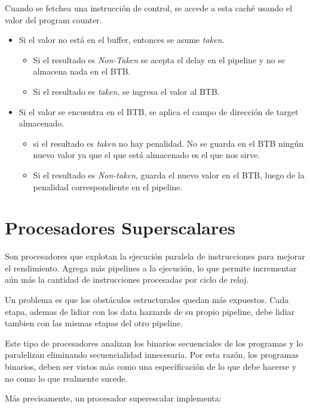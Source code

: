 \begin{itemize}
	Cuando se fetchea una instrucción de control, se accede a esta caché usando el valor del program counter.
	\begin{itemize}
		\item Si el valor no está en el buffer, entonces se asume \textit{taken}.
		\begin{itemize}
			\item Si el resultado es \textit{Non-Taken} se acepta el delay en el pipeline y no se almacena nada en el BTB.
			\item Si el resultado es \textit{taken}, se ingresa el valor al BTB.
		\end{itemize}
		\item Si el valor se encuentra en el BTB, se aplica el campo de dirección de target almacenado.
		\begin{itemize}
			\item si el resultado es \textit{taken} no hay penalidad. No se guarda en el BTB ningún nuevo valor ya que el que está almacenado es el que nos sirve.
			\item Si el resultado es \textit{Non-taken}, guarda el nuevo valor en el BTB, luego de la penalidad correspondiente en el pipeline. 
		\end{itemize}
	\end{itemize}
\end{itemize}

\newpage
\section{Procesadores Superscalares}
Son procesadores que explotan la ejecución paralela de instrucciones para mejorar el rendimiento. Agrega más pipelines a la ejecución, lo que permite incrementar aún más la cantidad de instrucciones procesadas por ciclo de reloj.

Un problema es que los obstáculos estructurales quedan más expuestos. Cada etapa, ademas de lidiar con los data hazzards de su propio pipeline, debe lidiar tambien con las mismas etapas del otro pipeline. 

Este tipo de procesadores analizan los binarios secuenciales de los programas y lo paralelizan eliminando secuencialidad innecesaria. Por esta razón, los programas binarios, deben ser vistos más como una especificación de lo que debe hacerse y no como lo que realmente sucede.

Más precisamente, un procesador superescalar implementa:

